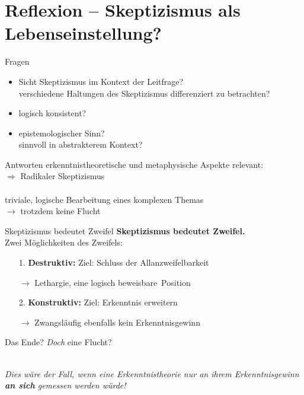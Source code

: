 \documentclass[12pt]{beamer}
\begin{document}
\section{Reflexion – Skeptizismus als Lebenseinstellung?}
\begin{frame}{Fragen}
\begin{itemize}
\item Sicht Skeptizismus im Kontext der Leitfrage?\\
verschiedene Haltungen des Skeptizismus differenziert zu betrachten?
\item logisch konsistent?
\item epistemologischer Sinn?\\
sinnvoll in abstrakterem Kontext? %
\end{itemize}
\end{frame}

\begin{frame}{Antworten}
erkenntnistheoretische und metaphysische Aspekte relevant:\\
$\Rightarrow$ Radikaler Skeptizismus\\
\ \\
\glqq triviale\grqq , logische Bearbeitung eines komplexen Themas\\
$\rightarrow$ trotzdem keine \glqq Flucht\grqq
\end{frame}

\begin{frame}{Skeptizismus bedeutet Zweifel}
\textbf{Skeptizismus bedeutet Zweifel.}\\
Zwei Möglichkeiten des Zweifels:
\begin{itemize}
\item[1.] \textbf{Destruktiv:} Ziel: Schluss der Allanzweifelbarkeit
\item[$\rightarrow$] Lethargie, eine logisch \glqq beweisbare\grqq\ Position
\item[2.] \textbf{Konstruktiv:} Ziel: Erkenntnis erweitern
\item[$\rightarrow$] Zwangsläufig ebenfalls kein Erkenntnisgewinn
\end{itemize}
\end{frame}

\begin{frame}{Das Ende?}
\emph{Doch} eine Flucht?\\
\ \\
\begin{center}
\emph{Dies wäre der Fall, wenn eine Erkenntnistheorie nur an ihrem Erkenntnisgewinn \textbf{an sich} gemessen werden würde!}
\end{center}
\end{frame}
\end{document}
